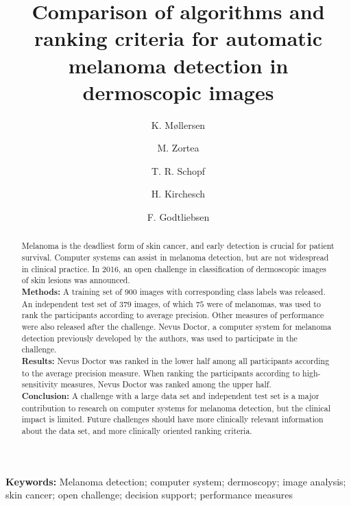 \documentclass[a4paper,12pt]{article}
\begin{document}
\author[1,*]{\footnotesize K. M{\o}llersen} 
\author[2]{M. Zortea}
\author[3]{T. R. Schopf}
\author[4]{H. Kirchesch}
\author[2]{F. Godtliebsen}




\title{Comparison of algorithms and ranking criteria for automatic melanoma detection in dermoscopic images}
\date{}

\maketitle

{\bf Keywords:} Melanoma detection; computer system; dermoscopy; image analysis; skin cancer; open challenge; decision support; performance measures

\begin{abstract}
 Melanoma is the deadliest form of skin cancer, and early detection is crucial for patient survival. Computer systems can assist in melanoma detection, but are not widespread in clinical practice. In 2016, an open challenge in classification of dermoscopic images of skin lesions was announced.  \\ 
{\bf Methods:} A training set of $900$ images with corresponding class labels was released. An independent test set of $379$ images, of which $75$ were of melanomas, was used to rank the participants according to average precision. Other measures of performance were also released after the challenge. Nevus Doctor, a computer system for melanoma detection previously developed by the authors, was used to participate in the challenge.  \\
{\bf Results:} Nevus Doctor was ranked in the lower half among all participants according to the average precision measure. When ranking the participants according to high-sensitivity measures, Nevus Doctor was ranked among the upper half. \\ 
{\bf Conclusion:} A challenge with a large data set and independent test set is a major contribution to research on computer systems for melanoma detection, but the clinical impact is limited. Future challenges should have more clinically relevant information about the data set, and more clinically oriented ranking criteria. 
\end{abstract}
\end{document}
